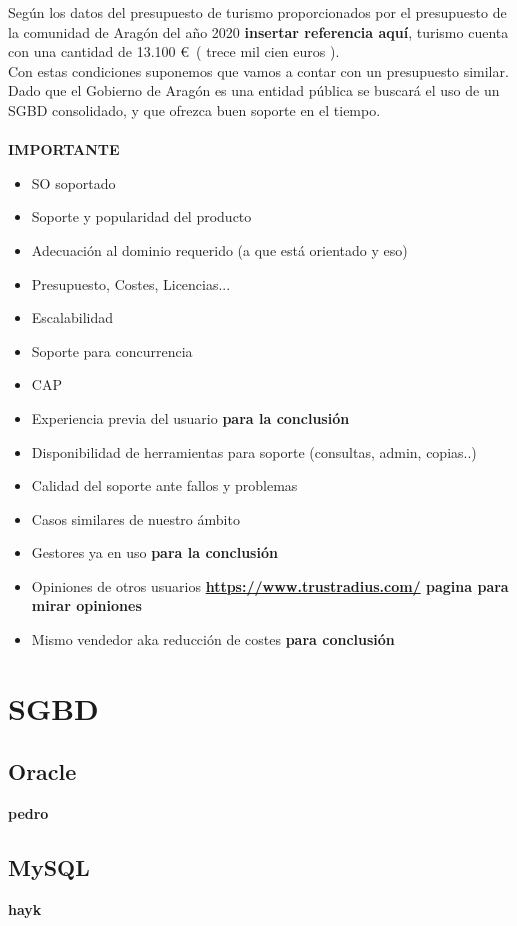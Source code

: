 \documentclass{article}
\begin{document}
Según los datos del presupuesto de turismo proporcionados por el presupuesto de la comunidad de Aragón del año 2020 \textbf{insertar referencia aquí}, turismo cuenta con una cantidad de 13.100 \euro \ ( trece mil cien euros ).\\
Con estas condiciones suponemos que vamos a contar con un presupuesto similar.\\

Dado que el Gobierno de Aragón es una entidad pública se buscará el uso de un SGBD consolidado, y que ofrezca buen soporte en el tiempo. \\\\


\textbf{IMPORTANTE}
\begin{itemize}
\item SO soportado
\item Soporte y popularidad del producto
\item Adecuación al dominio requerido (a que está orientado y eso)
\item Presupuesto, Costes, Licencias... 
\item Escalabilidad 
\item Soporte para concurrencia
\item CAP
\item Experiencia previa del usuario  \textbf{para la conclusión}
\item Disponibilidad de herramientas para soporte (consultas, admin, copias..)
\item Calidad del soporte ante fallos y problemas
\item Casos similares de nuestro ámbito 
\item Gestores ya en uso \textbf{para la conclusión}
\item Opiniones de otros usuarios \textbf{\url{https://www.trustradius.com/} pagina para mirar opiniones}
\item Mismo vendedor aka reducción de costes \textbf{para conclusión}
\end{itemize}


\section{SGBD}
\subsection{Oracle}
\textbf{pedro}
\subsection{MySQL}
\textbf{hayk}
\end{document}
